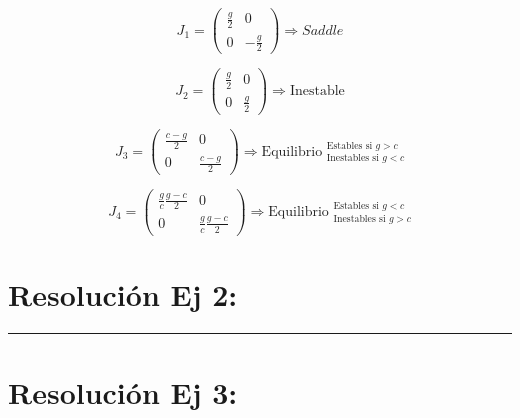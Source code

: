 \documentclass[twocolumn,aps,prl]{revtex4-1}
\newcommand*\sepline{%
  \begin{center}
    \rule[1ex]{.5\textwidth}{.5pt}
  \end{center}}
\begin{document}

$$ J_1 =
\begin{pmatrix}
    \frac{g}{2}
    &
    0
    \\  
    0
    &
    -\frac{g}{2}
\end{pmatrix}
\Rightarrow Saddle
$$

$$ J_2 =
\begin{pmatrix}
    \frac{g}{2}
    &
    0
    \\  
    0
    &
    \frac{g}{2}
\end{pmatrix}
\Rightarrow \text{Inestable}
$$

$$ J_3 =
\begin{pmatrix}
    \frac{c-g}{2}
    &
    0
    \\  
    0
    &
    \frac{c-g}{2}
\end{pmatrix}
\Rightarrow \text{Equilibrio }  ^{\text{Estables si } g>c}_{\text{Inestables si } g<c}
$$

$$ J_4 =
\begin{pmatrix}
    \frac{g}{c} \frac{g-c}{2}
    &
    0
    \\  
    0
    &
    \frac{g}{c} \frac{g-c}{2}
\end{pmatrix}
\Rightarrow \text{Equilibrio }  ^{\text{Estables si } g<c}_{\text{Inestables si } g>c}
$$


\section{Resolución Ej 2:}


\sepline



\section{Resolución Ej 3:}

% 
\end{document}

